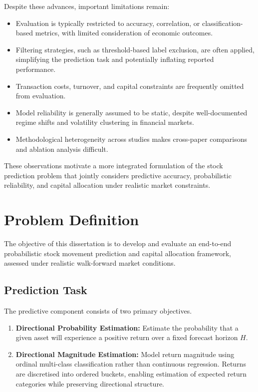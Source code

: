 \documentclass{l4proj}
\begin{document}
Despite these advances, important limitations remain:

\begin{itemize}
    \item Evaluation is typically restricted to accuracy, correlation, or classification-based metrics, with limited consideration of economic outcomes.
    \item Filtering strategies, such as threshold-based label exclusion, are often applied, simplifying the prediction task and potentially inflating reported performance.
    \item Transaction costs, turnover, and capital constraints are frequently omitted from evaluation.
    \item Model reliability is generally assumed to be static, despite well-documented regime shifts and volatility clustering in financial markets.
    \item Methodological heterogeneity across studies makes cross-paper comparisons and ablation analysis difficult.
\end{itemize}

These observations motivate a more integrated formulation of the stock prediction problem that jointly considers predictive accuracy, probabilistic reliability, and capital allocation under realistic market constraints.

\section{Problem Definition}

The objective of this dissertation is to develop and evaluate an end-to-end probabilistic stock movement prediction and capital allocation framework, assessed under realistic walk-forward market conditions.

\subsection{Prediction Task}

The predictive component consists of two primary objectives.

\begin{enumerate}
    \item \textbf{Directional Probability Estimation:}  
    Estimate the probability that a given asset will experience a positive return over a fixed forecast horizon $H$.

    \item \textbf{Directional Magnitude Estimation:}  
    Model return magnitude using ordinal multi-class classification rather than continuous regression. Returns are discretised into ordered buckets, enabling estimation of expected return categories while preserving directional structure.
\end{enumerate}
\end{document}
